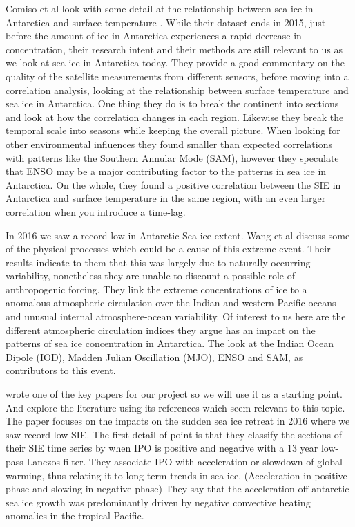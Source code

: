 \documentclass[../main.tex]{subfiles}
\begin{document}
Comiso et al look with some detail at the relationship between sea ice in Antarctica and surface temperature \cite{Comiso}. While their dataset ends in 2015, just before the amount of ice in Antarctica experiences a rapid decrease in concentration, their research intent and their methods are still relevant to us as we look at sea ice in Antarctica today. They provide a good commentary on the quality of the satellite measurements from different sensors, before moving into a correlation analysis, looking at the relationship between surface temperature and sea ice in Antarctica. One thing they do is to break the continent into sections and look at how the correlation changes in each region. Likewise they break the temporal scale into seasons while keeping the overall picture. When looking for other environmental influences they found smaller than expected correlations with patterns like the Southern Annular Mode (SAM), however they speculate that ENSO may be a major contributing factor to the patterns in sea ice in Antarctica. On the whole, they found a positive correlation between the SIE in Antarctica and surface temperature in the same region, with an even larger correlation when you introduce a time-lag. 

In 2016 we saw a record low in Antarctic Sea ice extent. Wang et al \cite{Wang2019} discuss some of the physical processes which could be a cause of this extreme event. Their results indicate to them that this was largely due to naturally occurring variability, nonetheless they are unable to discount a possible role of anthropogenic forcing. They link the extreme concentrations of ice to a anomalous atmospheric circulation over the Indian and western Pacific oceans and unusual internal atmosphere-ocean variability. Of interest to us here are the different atmospheric circulation indices they argue has an impact on the patterns of sea ice concentration in Antarctica. The look at the Indian Ocean Dipole (IOD), Madden Julian Oscillation (MJO), ENSO and SAM, as contributors to this event.


\cite{Meehl2016} wrote one of the key papers for our project so we will use it as a starting point. And explore the literature using its references which seem relevant to this topic. The paper focuses on the impacts on the sudden sea ice retreat in 2016 where we saw record low SIE. The first detail of point is that they classify the sections of their SIE time series by when IPO is positive and negative with a 13 year low-pass Lanczos filter. They associate IPO with acceleration or slowdown of global warming, thus relating it to long term trends in sea ice. (Acceleration in positive phase and slowing in negative phase) They say that the acceleration off antarctic sea ice growth was predominantly driven by negative convective heating anomalies in the tropical Pacific.
\end{document}
